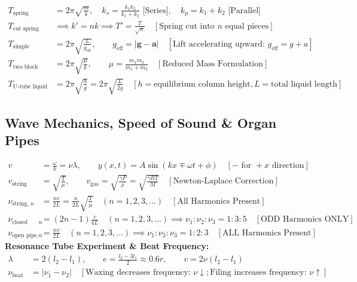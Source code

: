 \documentclass[11pt,a4paper]{article}
\begin{document}
\begin{formulabox}
\begin{align}
  T_{\text{spring}} &= 2\pi\sqrt{\frac{m}{k}}, \quad k_s = \frac{k_1 k_2}{k_1 + k_2} \text{ [Series]}, \quad k_p = k_1 + k_2 \text{ [Parallel]} \\
  T_{\text{cut spring}} &\implies k' = n k \implies T' = \frac{T}{\sqrt{n}} \quad [\text{Spring cut into } n \text{ equal pieces}] \\
  T_{\text{simple pendulum}} &= 2\pi\sqrt{\frac{L}{g_{\text{eff}}}}, \qquad g_{\text{eff}} = |\mathbf{g} - \mathbf{a}| \quad [\text{Lift accelerating upward: } g_{\text{eff}} = g+a] \\
  T_{\text{two block}} &= 2\pi\sqrt{\frac{\mu}{k}}, \qquad \mu = \frac{m_1 m_2}{m_1 + m_2} \quad [\text{Reduced Mass Formulation}] \\
  T_{\text{U-tube liquid}} &= 2\pi\sqrt{\frac{h}{g}} = 2\pi\sqrt{\frac{L}{2g}} \quad [h = \text{equilibrium column height}, L = \text{total liquid length}]
\end{align}
\end{formulabox}

\subsection{Wave Mechanics, Speed of Sound \& Organ Pipes}

\begin{formulabox}
\begin{align}
  v &= \frac{\omega}{k} = \nu\lambda, \qquad y(x,t) = A\sin(kx \mp \omega t + \phi) \quad [-\text{ for } +x\text{ direction}] \\
  v_{\text{string}} &= \sqrt{\frac{T}{\mu}}, \qquad v_{\text{gas}} = \sqrt{\frac{\gamma P}{\rho}} = \sqrt{\frac{\gamma R T}{M}} \quad [\text{Newton-Laplace Correction}] \\
  \nu_{\text{string, } n} &= \frac{n v}{2L} = \frac{n}{2L}\sqrt{\frac{T}{\mu}} \quad (n = 1, 2, 3, \dots) \quad [\text{All Harmonics Present}] \\
  \nu_{\text{closed pipe, } n} &= (2n - 1)\frac{v}{4L} \quad (n = 1, 2, 3, \dots) \implies \nu_1 : \nu_2 : \nu_3 = 1 : 3 : 5 \quad [\text{ODD Harmonics ONLY}] \\
  \nu_{\text{open pipe, } n} &= \frac{n v}{2L} \quad (n = 1, 2, 3, \dots) \implies \nu_1 : \nu_2 : \nu_3 = 1 : 2 : 3 \quad [\text{ALL Harmonics Present}]
\end{align}
\textbf{Resonance Tube Experiment \& Beat Frequency:}
\begin{align}
  \lambda &= 2(l_2 - l_1), \qquad e = \frac{l_2 - 3l_1}{2} \approx 0.6 r, \qquad v = 2\nu(l_2 - l_1) \\
  \nu_{\text{beat}} &= |\nu_1 - \nu_2| \quad [\text{Waxing decreases frequency: } \nu\downarrow; \text{Filing increases frequency: } \nu\uparrow]
\end{align}
\end{formulabox}
\end{document}
